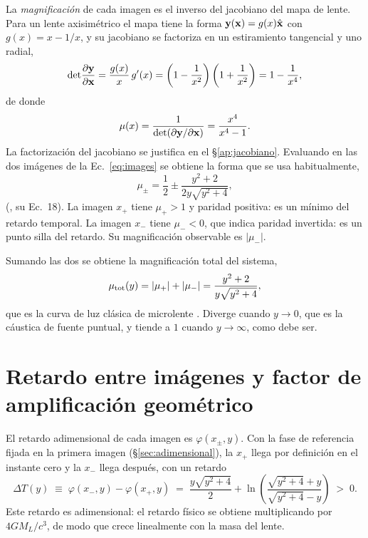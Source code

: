 \documentclass[11pt,a4paper,openany]{book}
\begin{document}
La \emph{magnificaci\'on} de cada imagen es el inverso del jacobiano del mapa
de lente. Para un lente axisim\'etrico el mapa tiene la forma
$\vb y(\vb x)=g(x)\hat{\vb x}$ con $g(x)=x-1/x$, y su jacobiano se factoriza
en un estiramiento tangencial y uno radial,
\begin{equation}
  \det\!\pdv{\vb y}{\vb x}=\frac{g(x)}{x}\,g'(x)
  =\left(1-\frac{1}{x^{2}}\right)\left(1+\frac{1}{x^{2}}\right)
  =1-\frac{1}{x^{4}} ,
  \label{eq:jacobian}
\end{equation}
de donde
\begin{equation}
  \mu(x)=\frac{1}{\det(\partial\vb y/\partial\vb x)}=\frac{x^{4}}{x^{4}-1} .
  \label{eq:magnification}
\end{equation}
La factorizaci\'on del jacobiano se justifica en el \S\ref{ap:jacobiano}.
Evaluando en las dos im\'agenes de la Ec.~\eqref{eq:images} se obtiene la forma
que se usa habitualmente,
\begin{equation}
  \mu_\pm=\frac12\pm\frac{y^{2}+2}{2y\sqrt{y^{2}+4}} ,
  \label{eq:mupm}
\end{equation}
(\citealp{Takahashi2003}, su Ec.~18). La imagen $x_+$ tiene $\mu_+>1$ y
paridad positiva: es un m\'inimo del retardo temporal. La imagen $x_-$ tiene
$\mu_-<0$, que indica paridad invertida: es un punto silla del retardo. Su
magnificaci\'on observable es $|\mu_-|$.

Sumando las dos se obtiene la magnificaci\'on total del sistema,
\begin{equation}
  \mu_{\rm tot}(y)=|\mu_+|+|\mu_-|=\frac{y^{2}+2}{y\sqrt{y^{2}+4}} ,
  \label{eq:paczynski}
\end{equation}
que es la curva de luz cl\'asica de microlente \citep{Paczynski1986}. Diverge
cuando $y\to0$, que es la c\'austica de fuente puntual, y tiende a $1$ cuando
$y\to\infty$, como debe ser.

\section{Retardo entre im\'agenes y factor de amplificaci\'on geom\'etrico}
\label{sec:fgeo}

El retardo adimensional de cada imagen es $\varphi(x_\pm,y)$. Con la fase de
referencia fijada en la primera imagen (\S\ref{sec:adimensional}), la
$x_+$ llega por definici\'on en el instante cero y la $x_-$ llega despu\'es,
con un retardo
\begin{equation}
  \Delta T(y)\;\equiv\;\varphi(x_-,y)-\varphi(x_+,y)
  \;=\;\frac{y\sqrt{y^{2}+4}}{2}
  +\ln\!\left(\frac{\sqrt{y^{2}+4}+y}{\sqrt{y^{2}+4}-y}\right)\;>\;0 .
  \label{eq:deltaT}
\end{equation}
Este retardo es adimensional: el retardo f\'isico se obtiene multiplicando por
$4GM_L/c^{3}$, de modo que crece linealmente con la masa del lente.
\end{document}

